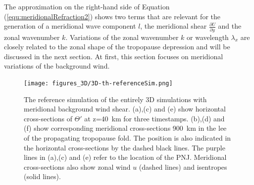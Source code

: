 The approximation on the right-hand side of Equation (\ref{equ:meridionalRefraction2}) shows two terms that are relevant for the generation of a meridional wave component $l$, the meridional shear $\frac{\partial U}{\partial y}$ and the zonal wavenumber $k$. Variations of the zonal wavenumber $k$ or wavelength $\lambda_x$ are closely related to the zonal shape of the tropopause depression and will be discussed in the next section. At first, this section focuses on meridional variations of the background wind.

\begin{figure}[tbp]
    \centering
    \texttt{[image: figures\_3D/3D-th-referenceSim.png]}
    \caption{The reference simulation of the entirely 3D simulations with meridional background wind shear. (a),(c) and (e) show horizontal cross-sections of $\Theta'$ at z=\SI{40}{\kilo\meter} for three timestamps. (b),(d) and (f) show corresponding meridional cross-sections \SI{900}{\kilo\meter} in the lee of the propagating tropopause fold. The position is also indicated in the horizontal cross-sections by the dashed black lines. The purple lines in (a),(c) and (e) refer to the location of the PNJ. Meridional cross-sections also show zonal wind $u$ (dashed lines) and isentropes (solid lines).}
    \label{fig:3D-reference}
\end{figure}

